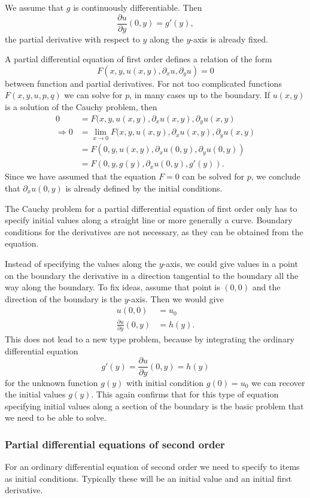 We assume that $g$ is continuously differentiable.
Then
\[
\frac{\partial u}{\partial y}(0, y)=g'(y),
\]
the partial derivative with respect to $y$ along the $y$-axis is already
fixed.

A partial differential equation of first order defines a relation
of the form
\[
F(x,y,u(x,y), \partial_x u, \partial_y u)=0
\]
between function and partial derivatives.
For not too complicated functions $F(x,y,u,p,q)$ we can solve for
$p$, in many cases up to the boundary.
If $u(x,y)$ is a solution of the Cauchy problem, then
\begin{align*}
0&=
F(x,y,u(x,y), \partial_x u(x,y), \partial_y u(x,y)
\\
\Rightarrow
0&=
\lim_{x\to 0}
F(x,y,u(x,y), \partial_x u(x,y), \partial_y u(x,y)\\
&=F(0,y,u(x,y),\partial_x u(0,y), \partial_y u(0,y))
\\
&=
F(0,y,g(y),\partial_x u(0,y), g'(y)).
\end{align*}
Since we have assumed that the equation $F=0$ can be solved 
for $p$, we conclude that 
$\partial_x u(0,y)$
is already defined by the initial conditions.

The Cauchy problem for a partial differential equation of first order
only has to specify initial values along a straight line or more generally
a curve.
Boundary conditions for the derivatives are not necessary, as they can
be obtained from the equation.

Instead of specifying the values along the $y$-axis, we could give values
in a point on the boundary the derivative in a direction tangential to
the boundary all the way along the boundary.
To fix ideas, assume that point is $(0,0)$ and the direction of the
boundary is the $y$-axis.
Then we would give 
\begin{align*}
u(0,0)&=u_0\\
\frac{\partial u}{\partial y}(0,y)&=h(y).
\end{align*}
This does not lead to a new type problem, because by integrating
the ordinary differential equation
\[
g'(y)=\frac{\partial u}{\partial y}(0,y)=h(y)
\]
for the unknown function $g(y)$ with initial condition $g(0)=u_0$
we can recover the initial values $g(y)$.
This again confirms that for this type of equation specifying 
initial values along a section of the boundary is the basic problem
that we need to be able to solve.

\subsubsection{Partial differential equations of second order}
For an ordinary differential equation of second order we need to specify
to items as initial conditions.
Typically these will be an initial value and an initial first derivative.

